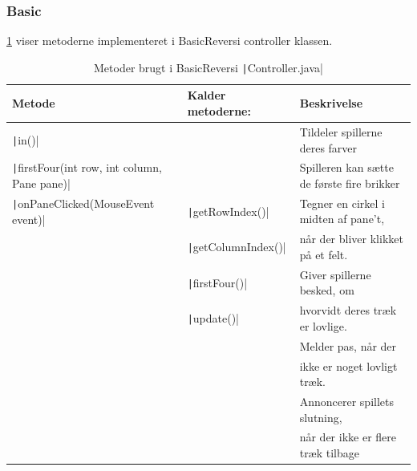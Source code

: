 \subsubsection{Basic}
\cref{tbl:1} viser metoderne implementeret i BasicReversi controller klassen.
\begin{table}[H]
    \centering
    \caption{Metoder brugt i BasicReversi \texttt|Controller.java|}\label{tbl:1}
    \begin{tabular}{lll}
        \toprule
        Metode                                                       & Kalder metoderne:                   & Beskrivelse                                          \\
        \midrule
        \texttt|in()|                                      &                                     & Tildeler spillerne deres farver                      \\
        \texttt|firstFour(int row, int column, Pane pane)| &                                     & Spilleren kan sætte de første fire brikker           \\
        \texttt|onPaneClicked(MouseEvent event)|           & \texttt|getRowIndex()|    & Tegner en cirkel i midten af pane't,                 \\
                                                                     & \texttt|getColumnIndex()| & når der bliver klikket på et felt.                   \\
                                                                     & \texttt|firstFour()|      & Giver spillerne besked, om                           \\
                                                                     & \texttt|update()|         & hvorvidt deres træk er lovlige.                      \\
                                                                     &                                     & Melder pas, når der                                  \\
                                                                     &                                     & ikke er noget lovligt træk.                          \\
                                                                     &                                     & Annoncerer spillets slutning,                        \\
                                                                     &                                     & når der ikke er flere træk tilbage                   \\

\end{tabular}
\end{table}
